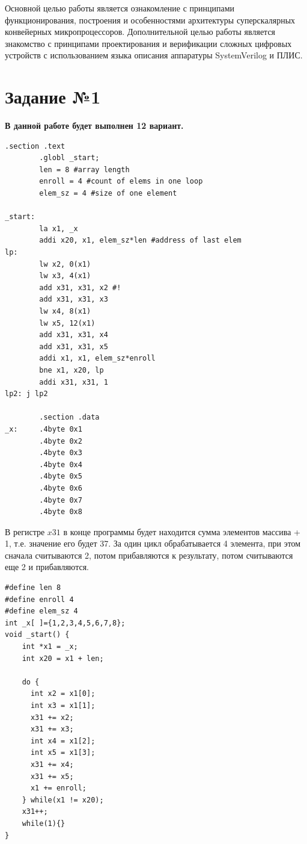 \setcounter{page}{2}


Основной целью работы является ознакомление с принципами функционирования, построения и особенностями архитектуры суперскалярных конвейерных микропроцессоров.
Дополнительной целью работы является знакомство с принципами проектирования и верификации сложных цифровых устройств с использованием языка описания аппаратуры SystemVerilog и ПЛИС.

\chapter{Задание №1}

\textbf{В данной работе будет выполнен 12 вариант.}

\captionsetup{singlelinecheck = false, justification=raggedright}
\begin{lstlisting}[label=code, caption=Код рассматриваемой программы]
  .section .text
        .globl _start;
        len = 8 #array length
        enroll = 4 #count of elems in one loop
		elem_sz = 4 #size of one element

_start:
        la x1, _x
        addi x20, x1, elem_sz*len #address of last elem
lp:
        lw x2, 0(x1)
        lw x3, 4(x1)
        add x31, x31, x2 #!
        add x31, x31, x3
        lw x4, 8(x1)
        lw x5, 12(x1)
        add x31, x31, x4
        add x31, x31, x5
        addi x1, x1, elem_sz*enroll
        bne x1, x20, lp
        addi x31, x31, 1
lp2: j lp2

        .section .data
_x:     .4byte 0x1
        .4byte 0x2
        .4byte 0x3
        .4byte 0x4
        .4byte 0x5
        .4byte 0x6
        .4byte 0x7
        .4byte 0x8
\end{lstlisting}

В регистре $x31$ в конце программы будет находится сумма элементов массива + 1, т.е. значение его будет 37. За один цикл обрабатывается 4 элемента, при этом сначала считываются 2, потом прибавляются к результату, потом считываются еще 2 и прибавляются.

\newpage
\begin{lstlisting}[label=code, caption=Псевдокод рассматриваемой программы]
#define len 8
#define enroll 4
#define elem_sz 4
int _x[ ]={1,2,3,4,5,6,7,8};
void _start() {
	int *x1 = _x;
    int x20 = x1 + len;

    do {
      int x2 = x1[0];
      int x3 = x1[1];
      x31 += x2;
      x31 += x3;
      int x4 = x1[2];
      int x5 = x1[3];
      x31 += x4;
      x31 += x5;
      x1 += enroll;
    } while(x1 != x20);
    x31++;
    while(1){}
}
\end{lstlisting}


